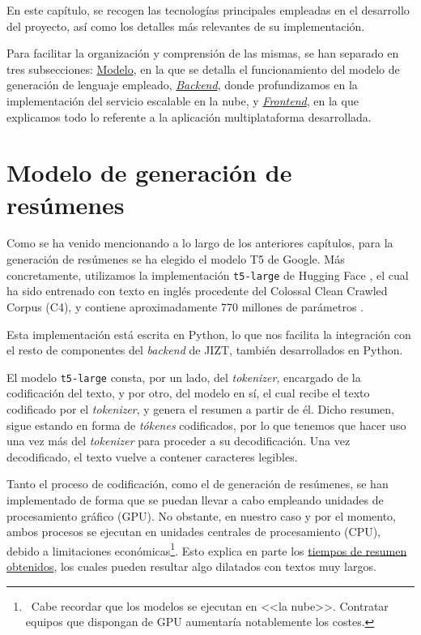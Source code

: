  \label{chapter:tecnicas}

En este capítulo, se recogen las tecnologías principales empleadas en el desarrollo del proyecto, así como los detalles más relevantes de su implementación.

Para facilitar la organización y comprensión de las mismas, se han separado en tres subsecciones: \hyperref[sec:model]{Modelo}, en la que se detalla el funcionamiento del modelo de generación de lenguaje empleado, \hyperref[sec:backend]{\emph{Backend}}, donde profundizamos en la implementación del servicio escalable en la nube, y \hyperref[sec:frontend]{\emph{Frontend}}, en la que explicamos todo lo referente a la aplicación multiplataforma desarrollada.


\section{Modelo de generación de resúmenes} \label{sec:model}

Como se ha venido mencionando a lo largo de los anteriores capítulos, para la generación de resúmenes se ha elegido el modelo T5 de Google. Más concretamente, utilizamos la implementación \texttt{t5-large} de Hugging Face \cite{t5-hf}, el cual ha sido entrenado con texto en inglés procedente del Colossal Clean Crawled Corpus (C4), y contiene aproximadamente 770 millones de parámetros \cite{hf-pretrained}.

Esta implementación está escrita en Python, lo que nos facilita la integración con el resto de componentes del \emph{backend} de JIZT, también desarrollados en Python.

El modelo \texttt{t5-large} consta, por un lado, del \emph{tokenizer}, encargado de la codificación del texto, y por otro, del modelo en sí, el cual recibe el texto codificado por el \emph{tokenizer}, y genera el resumen a partir de él. Dicho resumen, sigue estando en forma de \emph{tókenes} codificados, por lo que tenemos que hacer uso una vez más del \emph{tokenizer} para proceder a su decodificación. Una vez decodificado, el texto vuelve a contener caracteres legibles.

Tanto el proceso de codificación, como el de generación de resúmenes, se han implementado de forma que se puedan llevar a cabo empleando unidades de procesamiento gráfico (GPU). No obstante, en nuestro caso y por el momento, ambos procesos se ejecutan en unidades centrales de procesamiento (CPU), debido a limitaciones económicas\footnote{\, Cabe recordar que los modelos se ejecutan en <<la nube>>. Contratar equipos que dispongan de GPU aumentaría notablemente los costes.}. Esto explica en parte los \hyperref[table:comparativa]{tiempos de resumen obtenidos}, los cuales pueden resultar algo dilatados con textos muy largos.

